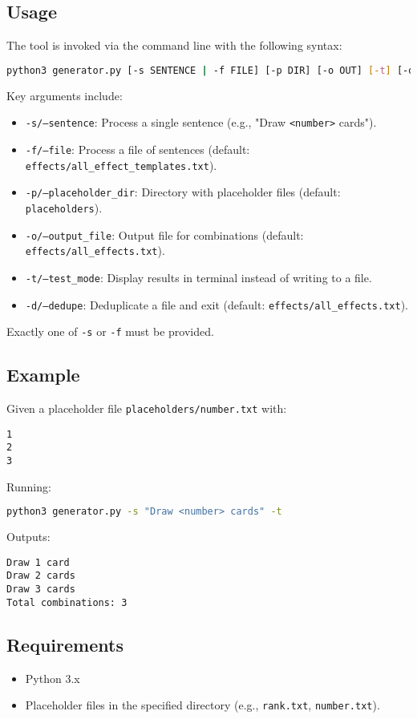 \subsection{Usage}
The tool is invoked via the command line with the following syntax:
\begin{lstlisting}[language=bash]
python3 generator.py [-s SENTENCE | -f FILE] [-p DIR] [-o OUT] [-t] [-d [FILE]]
\end{lstlisting}
Key arguments include:
\begin{itemize}
    \item \texttt{-s/--sentence}: Process a single sentence (e.g., "Draw \texttt{<number>} cards").
    \item \texttt{-f/--file}: Process a file of sentences (default: \texttt{effects/all\_effect\_templates.txt}).
    \item \texttt{-p/--placeholder\_dir}: Directory with placeholder files (default: \texttt{placeholders}).
    \item \texttt{-o/--output\_file}: Output file for combinations (default: \texttt{effects/all\_effects.txt}).
    \item \texttt{-t/--test\_mode}: Display results in terminal instead of writing to a file.
    \item \texttt{-d/--dedupe}: Deduplicate a file and exit (default: \texttt{effects/all\_effects.txt}).
\end{itemize}
Exactly one of \texttt{-s} or \texttt{-f} must be provided.

\subsection{Example}
Given a placeholder file \texttt{placeholders/number.txt} with:
\begin{lstlisting}
1
2
3
\end{lstlisting}
Running:
\begin{lstlisting}[language=bash]
python3 generator.py -s "Draw <number> cards" -t
\end{lstlisting}
Outputs:
\begin{lstlisting}
Draw 1 card
Draw 2 cards
Draw 3 cards
Total combinations: 3
\end{lstlisting}

\subsection{Requirements}
\begin{itemize}
    \item Python 3.x
    \item Placeholder files in the specified directory (e.g., \texttt{rank.txt}, \texttt{number.txt}).
\end{itemize}

